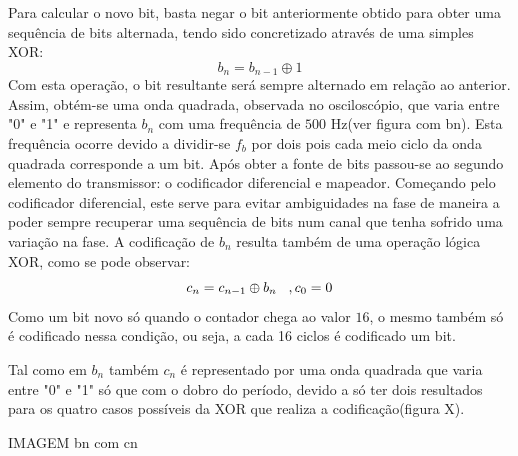 \documentclass[11pt]{article}
\begin{document}
Para calcular o novo bit, basta negar o bit anteriormente obtido para obter uma sequência de bits alternada, tendo sido concretizado através de uma simples XOR:
\begin{equation}
b_n=b_{n-1} \oplus 1
\end{equation}
Com esta operação, o bit resultante será sempre alternado em relação ao anterior.
Assim, obtém-se uma onda quadrada, observada no osciloscópio, que varia entre "0" e "1" e representa $ b_n $  com uma frequência de $500$ Hz(ver figura com bn). Esta frequência ocorre devido a dividir-se  $f_b$ por dois pois cada meio ciclo da onda quadrada corresponde a um bit.  
\vfill
Após obter a fonte de bits passou-se ao segundo elemento do transmissor: o codificador diferencial e mapeador. Começando pelo codificador diferencial, este serve para evitar ambiguidades na fase de maneira a poder sempre recuperar uma sequência de bits num canal que tenha sofrido uma variação na fase.
A codificação de $b_n$ resulta também de uma operação lógica XOR, como se pode observar: 
\begin{equation}
c_n=c_{n-1} \oplus b_n \hspace{3 mm} ,c_0=0
\end{equation}
Como um bit novo só quando o contador chega ao valor $16$, o mesmo também só é codificado nessa condição, ou seja, a cada 16 ciclos é codificado um bit. 

Tal como em $ b_n $ também $ c_n $ é representado por uma onda quadrada que varia entre "0" e "1" só que com o dobro do período, devido a só ter dois resultados para os quatro casos possíveis da XOR que realiza a codificação(figura X).

IMAGEM bn com cn
\vfill
\end{document}
